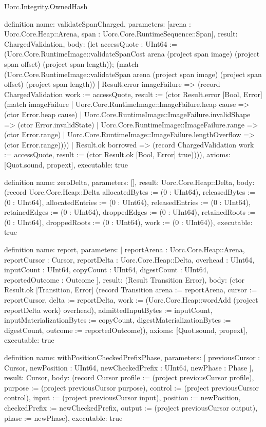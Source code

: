 \begin{lexlean}{Uorc.Integrity.OwnedHash}
\begin{semanticmodule}
definition{
  name: validateSpanCharged,
  parameters: [arena : Uorc.Core.Heap::Arena, span : Uorc.Core.RuntimeSequence::Span],
  result: ChargedValidation,
  body: (let accessQuote : UInt64 := (Uorc.Core.RuntimeImage::validateSpanCost arena (project span image) (project span offset) (project span length)); (match (Uorc.Core.RuntimeImage::validateSpan arena (project span image) (project span offset) (project span length))
    | Result.error imageFailure => (record ChargedValidation {work := accessQuote, result := (ctor Result.error [Bool, Error] (match imageFailure
      | Uorc.Core.RuntimeImage::ImageFailure.heap cause => (ctor Error.heap cause)
      | Uorc.Core.RuntimeImage::ImageFailure.invalidShape => (ctor Error.invalidState)
      | Uorc.Core.RuntimeImage::ImageFailure.range => (ctor Error.range)
      | Uorc.Core.RuntimeImage::ImageFailure.lengthOverflow => (ctor Error.range)))})
    | Result.ok borrowed => (record ChargedValidation {work := accessQuote, result := (ctor Result.ok [Bool, Error] true)}))),
  axioms: [Quot.sound, propext],
  executable: true
}

definition{
  name: zeroDelta,
  parameters: [],
  result: Uorc.Core.Heap::Delta,
  body: (record Uorc.Core.Heap::Delta {allocatedBytes := (0 : UInt64), releasedBytes := (0 : UInt64), allocatedEntries := (0 : UInt64), releasedEntries := (0 : UInt64), retainedEdges := (0 : UInt64), droppedEdges := (0 : UInt64), retainedRoots := (0 : UInt64), droppedRoots := (0 : UInt64), work := (0 : UInt64)}),
  executable: true
}

definition{
  name: report,
  parameters: [
    reportArena : Uorc.Core.Heap::Arena,
    reportCursor : Cursor,
    reportDelta : Uorc.Core.Heap::Delta,
    overhead : UInt64,
    inputCount : UInt64,
    copyCount : UInt64,
    digestCount : UInt64,
    reportedOutcome : Outcome
  ],
  result: (Result Transition Error),
  body: (ctor Result.ok [Transition, Error] (record Transition {arena := reportArena, cursor := reportCursor, delta := reportDelta, work := (Uorc.Core.Heap::wordAdd (project reportDelta work) overhead), admittedInputBytes := inputCount, inputMaterializationBytes := copyCount, digestMaterializationBytes := digestCount, outcome := reportedOutcome})),
  axioms: [Quot.sound, propext],
  executable: true
}

definition{
  name: withPositionCheckedPrefixPhase,
  parameters: [
    previousCursor : Cursor,
    newPosition : UInt64,
    newCheckedPrefix : UInt64,
    newPhase : Phase
  ],
  result: Cursor,
  body: (record Cursor {profile := (project previousCursor profile), purpose := (project previousCursor purpose), control := (project previousCursor control), input := (project previousCursor input), position := newPosition, checkedPrefix := newCheckedPrefix, output := (project previousCursor output), phase := newPhase}),
  executable: true
}


\end{semanticmodule}
\end{lexlean}

